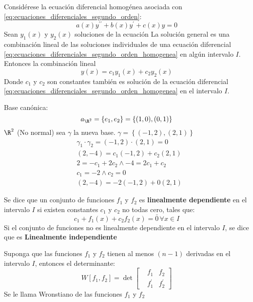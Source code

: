 \begin{theorem}[Superposición]
    Considérese la ecuación diferencial homogénea asociada con \eqref{eq:ecuaciones_diferenciales_segundo_orden}:
    \begin{equation}
        a(x)y^{\prime\prime} + b(x)y^{\prime} + c(x)y= 0
        \label{eq:ecuaciones_diferenciales_segundo_orden_homogenea}
    \end{equation}
    Sean $y_1(x)$ y $y_2(x)$ soluciones de la ecuación
    La solución general es una combinación lineal de las soluciones individuales de una ecuación diferencial \eqref{eq:ecuaciones_diferenciales_segundo_orden_homogenea} en algún intervalo $I$. Entonces la combinación lineal 
    \begin{equation}
        y(x) = c_1y_1(x) + c_2y_2(x)
    \end{equation}
    Donde $c_1$ y $c_2$ son constantes también es solución de la ecuación diferencial \eqref{eq:ecuaciones_diferenciales_segundo_orden_homogenea} en el intervalo $I$.
\end{theorem}
Base canónica:
\begin{equation}
    a_{\R^2} = \left\{ e_1,e_2 \right\} = \left\{ (1,0), (0,1) \right\}
\end{equation}
$\R^2$ (No normal) sea $\gamma$ la nueva base. $\gamma= \left\{ (-1,2), (2,1) \right\}$
\begin{align*}
    &\gamma_1\cdot \gamma_2 = ( - 1,2)\cdot (2,1) = 0\\
    &(2, - 4) = c_1(- 1,2) + c_2(2,1)\\
    &2 =- c_1 + 2c_2\land - 4 = 2c_1 + c_2\\
    &c_1 = - 2\land c_2 = 0\\
    &(2, - 4) =- 2( - 1,2) + 0(2,1)
\end{align*}
\begin{definition}
    Se dice que un conjunto de funciones $f_1$ y $f_2$ es \textbf{linealmente dependiente} en el intervalo $I$ si existen constantes $c_1$ y $c_2$ no todas cero, tales que:
    \begin{equation}
        c_1 + f_1(x) + c_2f_2(x) = \bar{0}\, \forall x\in I
    \end{equation}
    Si el conjunto de funciones no es linealmente dependiente en el intervalo $I$, se dice que es \textbf{Linealmente independiente}
\end{definition}

\begin{definition}
    Suponga que las funciones $f_1$ y $f_2$ tienen al menos $(n-1)$ derivadas en el intervalo $I$, entonces el determinante: 
    \begin{equation}
        W\left[ f_1,f_2 \right] = \det\begin{bmatrix}
            &f_1 &f_2  \\
            &f_1^{\prime}&f_2^{\prime}  
        \end{bmatrix}
    \end{equation}
Se le llama Wronstiano de las funciones $f_1$ y $f_2$
\end{definition}

